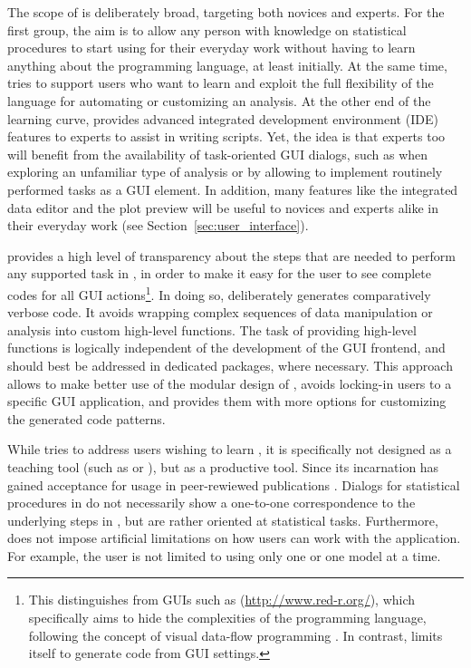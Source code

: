 The scope of  is deliberately broad, targeting both  novices and experts.
For the first group, the aim is to allow any person with knowledge on
statistical procedures to start using  for their everyday work 
without having to learn anything about the  programming language,
at least initially. At the same time,  tries to support users who want to learn and
exploit the full flexibility of the  language for automating or customizing
an analysis. At the other end of the learning curve,  provides advanced integrated development environment (IDE)
features to  experts to assist in writing  scripts. Yet, the idea
is that  experts too will benefit from the availability of task-oriented GUI
dialogs, such as when exploring an unfamiliar type of analysis
or by allowing to implement routinely performed tasks as a GUI element. In
addition, many features like the integrated data editor and the plot preview 
will be useful to  novices and  experts alike in their everyday work
(see Section~\ref{sec:user_interface}).

 provides a high level of transparency about the steps that are needed to
perform any supported task in , in order to make it easy for the user to see
complete codes for all GUI actions\footnote{
  This distinguishes  from  GUIs such as  (\url{http://www.red-r.org/}), which 
  specifically aims to hide the complexities of the  programming language, following the concept of visual data-flow 
  programming \citep{Sutherland1966}. In contrast,  limits itself to generate  code from GUI settings.
}. In doing so,  deliberately generates
comparatively verbose code. It avoids wrapping complex sequences of data
manipulation or analysis into custom high-level  functions. The task of
providing high-level functions is logically independent of the development of the
GUI frontend, and should best be addressed in dedicated  packages, where necessary.
This approach allows to make better use of the modular design of , avoids
locking-in users to a specific GUI application, and provides them with more options for
customizing the generated code patterns.

While  tries to address users wishing to learn , it is specifically not
designed as a teaching tool (such as  or ), but as
a productive tool. Since its incarnation  has gained acceptance for usage in peer-rewiewed 
publications \citep{Zou2008, Zou2009, Rugg-Gunn2010, Yang2011, Roediger2011}.
Dialogs for statistical procedures in  do not
necessarily show a one-to-one correspondence to the underlying steps in , but are
rather oriented at statistical tasks. Furthermore,  does not impose
artificial limitations on how users can work with the application. For example,
the user is not limited to using only one  or one model at a
time.

